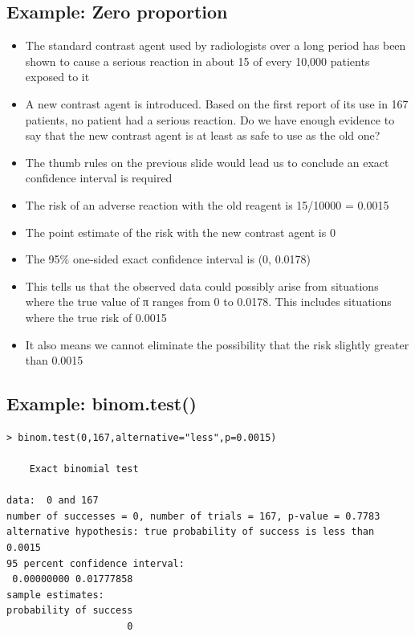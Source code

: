 \documentclass[
]{book}
\providecommand{\tightlist}{%
  \setlength{\itemsep}{0pt}\setlength{\parskip}{0pt}}
\begin{document}
\hypertarget{example-zero-proportion}{%
\subsection{Example: Zero proportion}\label{example-zero-proportion}}

\begin{itemize}
\tightlist
\item
  The standard contrast agent used by radiologists over a long period has been shown to cause a serious reaction in about 15 of every 10,000 patients exposed to it
\item
  A new contrast agent is introduced. Based on the first report of its use in 167 patients, no patient had a serious reaction. Do we have enough evidence to say that the new contrast agent is at least as safe to use as the old one?
\item
  The thumb rules on the previous slide would lead us to conclude an exact confidence interval is required
\item
  The risk of an adverse reaction with the old reagent is 15/10000 = 0.0015
\item
  The point estimate of the risk with the new contrast agent is 0
\item
  The 95\% one-sided exact confidence interval is (0, 0.0178)
\item
  This tells us that the observed data could possibly arise from situations where the true value of π ranges from 0 to 0.0178. This includes situations where the true risk of 0.0015
\item
  It also means we cannot eliminate the possibility that the risk slightly greater than 0.0015
\end{itemize}

\hypertarget{example-binom.test}{%
\subsection{Example: binom.test()}\label{example-binom.test}}

\begin{verbatim}
> binom.test(0,167,alternative="less",p=0.0015)

    Exact binomial test

data:  0 and 167
number of successes = 0, number of trials = 167, p-value = 0.7783
alternative hypothesis: true probability of success is less than 0.0015
95 percent confidence interval:
 0.00000000 0.01777858
sample estimates:
probability of success 
                     0 
\end{verbatim}
\end{document}
